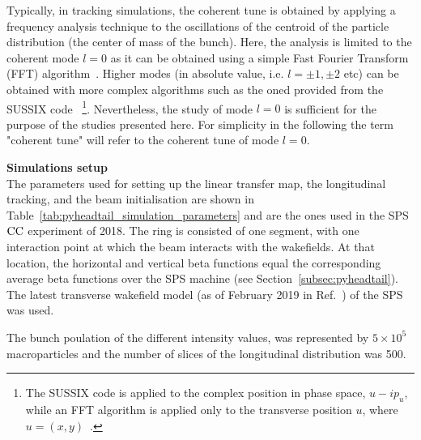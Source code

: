 Typically, in tracking simulations, the coherent tune is obtained by applying a frequency analysis technique to the oscillations of the centroid of the particle distribution (the center of mass of the bunch). Here, the analysis is limited to the coherent mode $l=0$ as it can be obtained using a simple Fast Fourier Transform (FFT) algorithm~\cite{FFT_and_applications}. Higher modes (in absolute value, i.e. $l=\pm 1, \pm 2$ etc) can be obtained with more complex algorithms such as the oned provided from the SUSSIX code~\cite{Bartolini:702438} \footnote{The SUSSIX code is applied to the complex position in phase space, $u-i p_u$, while an FFT algorithm is applied only to the transverse position $u$, where $u=(x,y)$~\cite{Salvant:1274254}.}. Nevertheless, the study of mode $l=0$ is sufficient for the purpose of the studies presented here. For simplicity in the following the term "coherent tune" will refer to the coherent tune of mode $l=0$.

\textbf{Simulations setup}\\
The parameters used for setting up the linear transfer map, the longitudinal tracking, and the beam initialisation are shown in Table~\ref{tab:pyheadtail_simulation_parameters} and are the ones used in the SPS ${\mathrm{CC}}$ experiment of 2018. The ring is consisted of one segment, with one interaction point at which the beam interacts with the wakefields. At that location, the horizontal and vertical beta functions equal the corresponding average beta functions over the SPS machine (see Section~\ref{subsec:pyheadtail}). The latest transverse wakefield model (as of February 2019 in Ref.~\cite{sps_impedance_model_git}) of the SPS was used.

The bunch poulation of the different intensity values, was represented by $5 \times 10^5$ macroparticles and the number of slices of the longitudinal distribution was 500.


